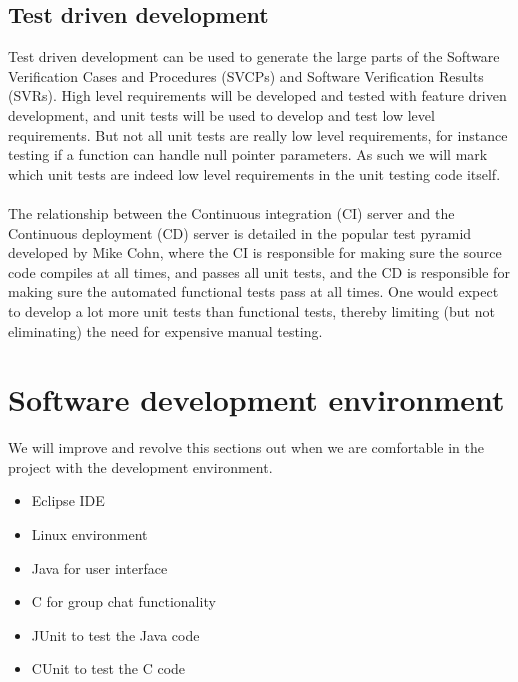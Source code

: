 \documentclass[a4paper]{article}
\begin{document}
\subsection{Test driven development}
Test driven development can be used to generate the large parts of the Software Verification Cases and Procedures (SVCPs) and Software Verification Results (SVRs). High level requirements will be developed and tested with feature driven development, and unit tests will be used to develop and test low level requirements. But not all unit tests are really low level requirements, for instance testing if a function can handle null pointer parameters. As such we will mark which unit tests are indeed low level requirements in the unit testing code itself.\\ 
\\
The relationship between the Continuous integration (CI) server and the Continuous deployment (CD) server is detailed in the popular test pyramid developed by Mike Cohn, where the CI is responsible for making sure the source code compiles at all times, and passes all unit tests, and the CD is responsible for making sure the automated functional tests pass at all times. One would expect to develop a lot more unit tests than functional tests, thereby limiting (but not eliminating) the need for expensive manual testing.\\
\newpage


\section{Software development environment}

We will improve and revolve this sections out when we are comfortable in the project with the development environment.

\begin{itemize}
	\item Eclipse IDE
	\item Linux environment
	\item Java for user interface
	\item C for group chat functionality
	\item JUnit to test the Java code
	\item CUnit to test the C code
\end{itemize}
\newpage

\end{document}
